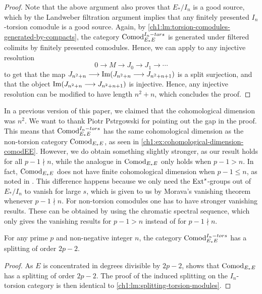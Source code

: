 \begin{proof}
    Note that the above argument also proves that $E_*/I_n$ is a good source, which by the Landweber filtration argument implies that any finitely presented $I_n$-torsion comodule is a good source. Again, by \cref{ch1:lm:torsion-comodules-generated-by-compacts}, the category $\mathrm{Comod}_{E_*E}^{I_n-tors}$ is generated under filtered colimits by finitely presented comodules. Hence, we can apply \cite[2.4]{pstragowski_2021} to any injective resolution 
    $$0\longrightarrow M \longrightarrow J_0 \longrightarrow J_1\longrightarrow \cdots$$
    to get that the map $J_{n^2+n}\longrightarrow \operatorname{Im}(J_{n^2+n}\longrightarrow J_{n^2+n+1})$ is a split surjection, and that the object $\operatorname{Im}(J_{n^2+n}\longrightarrow J_{n^2+n+1})$ is injective. Hence, any injective resolution can be modified to have length $n^2+n$, which concludes the proof. 
\end{proof}

\begin{remark}
    In a previous version of this paper, we claimed that the cohomological dimension was $n^2$. We want to thank Piotr Pstr\a{}gowski for pointing out the gap in the proof. This means that $\mathrm{Comod}_{E_*E}^{I_n-tors}$ has the same cohomological dimension as the non-torsion category $\mathrm{Comod}_{E_*E}$, as seen in \cref{ch1:ex:cohomological-dimension-comodEE}. However, we do obtain something slightly stronger, as our result holds for all $p-1\nmid n$, while the analogue in $\mathrm{Comod}_{E_*E}$ only holds when $p-1>n$. In fact, $\mathrm{Comod}_{E_*E}$ does not have finite cohomological dimension when $p-1\leq n$, as noted in \cite[2.6]{pstragowski_2021}. This difference happens because we only need the $\operatorname{Ext}^s$-groups out of $E_*/I_n$ to vanish for large $s$, which is given to us by Morava's vanishing theorem whenever $p-1\nmid n$. For non-torsion comodules one has to have stronger vanishing results. These can be obtained by using the chromatic spectral sequence, which only gives the vanishing results for $p-1>n$ instead of for $p-1\nmid n$. 
\end{remark}

\begin{lemma}
    \label{ch1:lm:splitting-torsion-comodules}
    For any prime $p$ and non-negative integer $n$, the category $\mathrm{Comod}_{E_*E}^{I_n-tors}$ has a splitting of order $2p-2$. 
\end{lemma}
\begin{proof}
    As $E$ is concentrated in degrees divisible by $2p-2$, \cite[8.13]{patchkoria-pstragowski_2021} shows that $\mathrm{Comod}_{E_*E}$ has a splitting of order $2p-2$. The proof of the induced splitting on the $I_n$-torsion category is then identical to \cref{ch1:lm:splitting-torsion-modules}. 
\end{proof}

